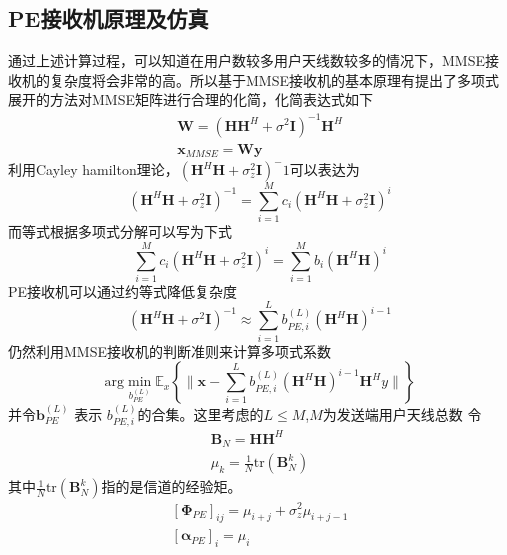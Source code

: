 \documentclass[bachelor,nocolorlinks, printoneside]{seuthesis} %
\begin{document}
\begin{Main}
\section{PE接收机原理及仿真}
通过上述计算过程，可以知道在用户数较多用户天线数较多的情况下，MMSE接收机的复杂度将会非常的高。所以基于MMSE接收机的基本原理有提出了多项式展开的方法对MMSE矩阵进行合理的化简，化简表达式如下
\begin{gather}\label{key}
\mathbf{W} = (\mathbf{H}\mathbf{H}^H + \sigma^2 \mathbf{I})^{-1}\mathbf{H}^H  \nonumber \\
\mathbf{x}_{MMSE} = \mathbf{W} \mathbf{y}  
\end{gather}
利用Cayley hamilton理论，$(\mathbf{H}^H\mathbf{H}+\sigma_z^2\mathbf{I})^-1$可以表达为
\begin{equation}\label{key}
(\mathbf{H}^H\mathbf{H}+\sigma^2_z\mathbf{I})^{-1} = \sum_{i=1}^M c_i(\mathbf{H}^H \mathbf{H}+\sigma^2_z\mathbf{I})^i
\end{equation}
而等式根据多项式分解可以写为下式
\begin{equation}\label{key}
\sum_{i=1}^M c_i(\mathbf{H}^H \mathbf{H}+\sigma^2_z\mathbf{I})^i=\sum_{i=1}^M b_i(\mathbf{H}^H\mathbf{H})^i
\end{equation}
PE接收机可以通过约等式降低复杂度
\begin{equation}\label{key}
(\mathbf{H}^H\mathbf{H}+\sigma^2\mathbf{I})^{-1} \approx \sum_{i=1}^{L} b_{PE,i}^{(L)}(\mathbf{H}^H\mathbf{H})^{i-1}
\end{equation}
仍然利用MMSE接收机的判断准则来计算多项式系数
\begin{equation}\label{key}
\mathrm{arg} \min_{b_{PE}^{(L)}} \mathbb{E}_x \left\lbrace \| \mathbf{x}-\sum_{i=1}^{L}b_{PE,i}^{(L)}(\mathbf{H}^H\mathbf{H})^{i-1}\mathbf{H}^Hy \| \right\rbrace
\end{equation}
并令$\mathbf{b}^{(L)}_{PE}$ 表示 $b_{PE,i}^{(L)}$的合集。这里考虑的$L \leq M$,$M$为发送端用户天线总数
令
\begin{gather}\label{key}
\mathbf{B}_N = \mathbf{H}\mathbf{H}^H \nonumber \\
\mu_k = \frac{1}{N} \mathrm{tr}(\mathbf{B}_N^k) \nonumber
\end{gather}
其中$\frac{1}{N} \mathrm{tr}(\mathbf{B}_N^k)$指的是信道的经验矩。
\begin{gather}\label{key}
[\mathbf{\Phi}_{PE}]_{ij} = \mu_{i+j} + \sigma_{z}^2 \mu_{i+j-1} \nonumber \\
\left[\mathbf{\alpha}_{PE}\right]_i = \mu_i
\end{gather}


\end{Main}
\end{document}
